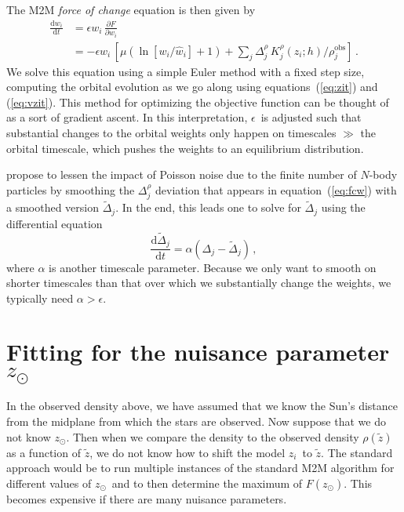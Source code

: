 \documentclass[12pt,preprint]{aastex}
\newcommand{\dd}{\mathrm{d}}
\newcommand{\eqnname}{equation}
\newcommand{\equationname}{\eqnname}
\newcommand{\zsun}{\ensuremath{z_\odot}}
\newcommand{\zi}{\ensuremath{z_i}}
\newcommand{\wi}{\ensuremath{w_i}}
\newcommand{\zobs}{\ensuremath{\tilde{z}}}
\newcommand{\eps}{\ensuremath{\epsilon}}
\begin{document}
The M2M \emph{force of change} equation is then given by
\begin{equation}
\begin{split}\label{eq:fcw}
  \frac{\dd \wi}{\dd t} & = \eps \wi\,\frac{\partial F}{\partial \wi}\\
  & = -\eps \wi \,\left[\mu \left(\ln\left[w_i/\hat{w}_i\right]+1\right)+ \sum_j \Delta^\rho_j\, K^\rho_j(\zi;h)/\rho_j^\mathrm{obs} \right]\,.
\end{split}
\end{equation}
We solve this equation using a simple Euler method with a fixed step
size, computing the orbital evolution as we go along using
\equationname s~(\ref{eq:zit}) and (\ref{eq:vzit}). This method for
optimizing the objective function can be thought of as a sort of
gradient ascent. In this interpretation, \eps\ is adjusted such that
substantial changes to the orbital weights only happen on timescales
$\gg$ the orbital timescale, which pushes the weights to an
equilibrium distribution.

\citet{Syer96a} propose to lessen the impact of Poisson noise due to
the finite number of $N$-body particles by smoothing the
$\Delta^\rho_j$ deviation that appears in \equationname~(\ref{eq:fcw})
with a smoothed version $\tilde{\Delta}_j$. In the end, this leads one
to solve for $\tilde{\Delta}_j$ using the differential equation
\begin{equation}
  \frac{\dd \tilde{\Delta}_j}{\dd t} = \alpha \left(\Delta_j-\tilde{\Delta}_j\right)\,,
\end{equation}
where $\alpha$ is another timescale parameter. Because we only want to
smooth on shorter timescales than that over which we substantially
change the weights, we typically need $\alpha > \eps$.

\section{Fitting for the nuisance parameter \protect\zsun}

In the observed density above, we have assumed that we know the Sun's
distance from the midplane from which the stars are observed. Now
suppose that we do not know \zsun. Then when we compare the density to
the observed density $\rho(\zobs)$ as a function of \zobs, we do not
know how to shift the model \zi\ to \zobs. The standard approach would
be to run multiple instances of the standard M2M algorithm for
different values of \zsun\ and to then determine the maximum of
$F(\zsun)$. This becomes expensive if there are many nuisance
parameters.
\end{document}
